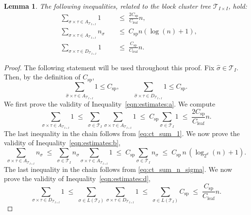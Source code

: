 \documentclass[final,3p,times]{elsarticle}
\newcommand{\mc}[1]{\mathcal{#1}}
\newtheorem{lemma}{Lemma}
\begin{document}
\begin{lemma}\label{lem:bc_estimates}
The following inequalities, related to the block cluster tree $\mc{T}_{I \times I}$, hold:
\begin{subequations}\label{eqn:estimates}
\begin{alignat}{2}
&\sum_{\sigma \times \tau \in A_{\mc{T}_{I \times I}}} 1
&&\;\le\; \frac{2C_{\text{sp}}}{C_{\text{leaf}}} n, \label{eqn:estimates:a} \\[2pt]
&\sum_{\sigma \times \tau \in A_{\mc{T}_{I \times I}}} n_{\sigma}
&&\;\le\; C_{\text{sp}} n (\log(n) + 1), \label{eqn:estimates:b} \\[2pt]
&\sum_{\sigma \times \tau \in D_{\mc{T}_{I \times I}}} 1
&&\;\le\; \frac{C_{\text{sp}}}{C_{\text{leaf}}} n . \label{eqn:estimates:d}
\end{alignat}
\end{subequations}
\end{lemma}
\begin{proof}
The following statement will be used throughout this proof. Fix $\hat{\sigma} \in \mc{T}_{I}$. Then, by the definition of $C_{\text{sp}}$,
\[
  \sum_{\hat{\sigma} \times \tau \in A_{\mc{T}_{I \times I}}} 1 \le C_{\text{sp}}, 
  \qquad 
  \sum_{\hat{\sigma} \times \tau \in D_{\mc{T}_{I \times I}}} 1 \le C_{\text{sp}} .
\]
We first prove the validity of Inequality~\eqref{eqn:estimates:a}. We compute
\[
  \sum_{\sigma \times \tau \in A_{\mc{T}_{I \times I}}} 1 
  \;\le\; \sum_{\sigma \in \mc{T}_{I}} \sum_{\sigma \times \tau \in A_{\mc{T}_{I \times I}}} 1
  \;\le\; C_{\text{sp}} \sum_{\sigma \in \mc{T}_{I}} 1
  \;\le\; \frac{2C_{\text{sp}}}{C_{\text{leaf}}} n .
\]
The last inequality in the chain follows from \eqref{eq:ct_sum_1}.
We now prove the validity of Inequality~\eqref{eqn:estimates:b},
\[
  \sum_{\sigma \times \tau \in A_{\mc{T}_{I \times I}}} n_{\sigma} 
  \;\le\; \sum_{\sigma \in \mc{T}_{I}} n_{\sigma} 
  \sum_{\sigma \times \tau \in A_{\mc{T}_{I \times I}}} 1
  \;\le\; C_{\text{sp}} \sum_{\sigma \in \mc{T}_{I}} n_{\sigma} 
  \;\le\; C_{\text{sp}} \, n \,(\log_{2^d}(n) + 1) .
\]
The last inequality in the chain follows from \eqref{eq:ct_sum_n_sigma}.
We now prove the validity of Inequality~\eqref{eqn:estimates:d},
\[
  \sum_{\sigma \times \tau \in D_{\mc{T}_{I \times I}}} 1
  \;\le\; \sum_{\sigma \in L(\mc{T}_{I})} 
  \sum_{\sigma \times \tau \in D_{\mc{T}_{I \times I}}} 1
  \;\le\; \sum_{\sigma \in L(\mc{T}_{I})} C_{\text{sp}}
  \;\le\; \frac{C_{\text{sp}}}{C_{\text{leaf}}} n .
\]
\end{proof}
\end{document}
